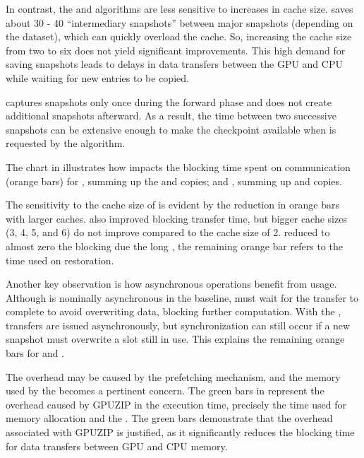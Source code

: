 \documentclass[Ingles,Final]{ic-tese-v3}
\begin{document}
In contrast, the \zcut and \uniform algorithms are less sensitive to increases in cache size. \zcut saves about 30 - 40 ``intermediary snapshots'' between major snapshots (depending on the dataset), which can quickly overload the cache. So, increasing the cache size from two to six does not yield significant improvements. This high demand for saving snapshots leads to delays in data transfers between the GPU and CPU while waiting for new entries to be copied.

\uniform captures snapshots only once during the forward phase and does not create additional snapshots afterward. As a result, the time between two successive snapshots can be extensive enough to make the checkpoint available when \restore is requested by the \checkpointing algorithm.

The chart in  illustrates how \checkpointprefetching impacts the blocking time spent on communication (orange bars) for \save, summing up the \dth and \dtd copies; and \restore, summing up \htd and \dtd copies. 

The sensitivity to the cache size of \revolve is evident by the reduction in orange bars with larger caches. \zcut also improved blocking transfer time, but bigger cache sizes (3, 4, 5, and 6) do not improve compared to the cache size of 2. \uniform reduced to almost zero the blocking \restore due the long , the remaining orange bar refers to the \dtd time used on restoration.

Another key observation is how asynchronous \save operations benefit from \cache usage. Although \save is nominally asynchronous in the baseline, \awave must wait for the transfer to complete to avoid overwriting data, blocking further computation. With the \cache, \dth transfers are issued asynchronously, but synchronization can still occur if a new snapshot must overwrite a slot still in use. This explains the remaining \save orange bars for \revolve and \zcut.

The overhead may be caused by the prefetching mechanism, and the memory used by the \cache becomes a pertinent concern. The green bars in  represent the overhead caused by GPUZIP in the execution time, precisely the time used for memory allocation and the \psa. The green bars demonstrate that the overhead associated with GPUZIP is justified, as it significantly reduces the blocking time for data transfers between GPU and CPU memory. 
\end{document}
